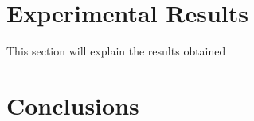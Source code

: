 \section{Experimental Results} \label{ch_5:sect:results}

  This section will explain the results obtained

\section{Conclusions} \label{ch_5:sect:conclusions}

